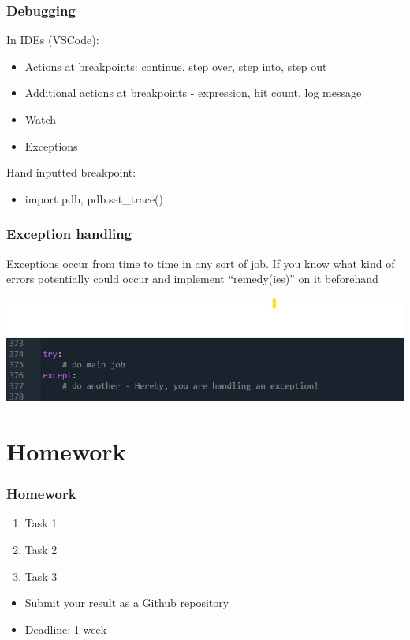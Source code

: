 \documentclass{beamer}
\begin{document}
\begin{frame}
    \frametitle{Debugging}

In IDEs (VSCode):

    \begin{itemize}
        \item Actions at breakpoints: continue, step over, step into, step out
        \item Additional actions at breakpoints - expression, hit count, log message
        \item Watch
        \item Exceptions
    \end{itemize}

\vskip 2mm

Hand inputted breakpoint:

    \begin{itemize}
        \item import pdb, pdb.set\_trace()
    \end{itemize}
\end{frame}

\begin{frame}
    \frametitle{Exception handling}
    Exceptions occur from time to time in any sort of job. 
    If you know what kind of errors potentially could occur
    and implement “remedy(ies)” on it beforehand
        \begin{center}
            \includegraphics[scale=0.5]{figures/exception.jpg}
        \end{center}
\end{frame}

\section{Homework} 

\begin{frame}
    \frametitle{Homework}
    \begin{enumerate}
        \item Task 1
        \item Task 2
        \item Task 3
    \end{enumerate}

    \vskip 2mm
    \begin{itemize}
        \item Submit your result as a Github repository
        \item Deadline: 1 week %
    \end{itemize}

\end{frame}
\end{document}
